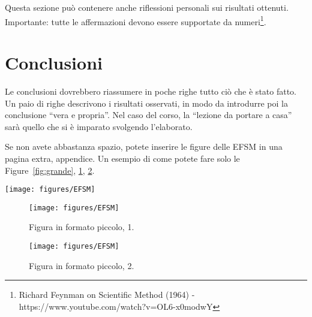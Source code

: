 \documentclass[]{IEEEtran}
\begin{document}
Questa sezione pu\`o contenere anche riflessioni personali sui risultati ottenuti. Importante: tutte le affermazioni devono essere supportate da numeri\footnote{Richard Feynman on Scientific Method (1964) -\\ https://www.youtube.com/watch?v=OL6-x0modwY}.

\section{Conclusioni}
Le conclusioni dovrebbero riassumere in poche righe  tutto ci\`o che \`e stato fatto. Un paio di righe descrivono i risultati osservati, in modo da introdurre poi la conclusione ``vera e propria''. Nel caso del corso, la ``lezione da portare a casa'' sar\`a quello che si \`e imparato svolgendo l'elaborato.





\appendix
Se non avete abbastanza spazio, potete inserire le figure delle EFSM in una  pagina extra, appendice. Un esempio di come potete fare solo le Figure~\ref{fig:grande}, \ref{fig:piccola1}, \ref{fig:piccola2}.


\begin{figure*}[bt]
\centering
\texttt{[image: figures/EFSM]}
\caption{Figura in formato grande.}
\label{fig:grande}
\end{figure*}

\begin{figure}[bt]
	\centering
	\texttt{[image: figures/EFSM]}
	\caption{Figura in formato piccolo, 1.}
	\label{fig:piccola1}
\end{figure}

\begin{figure}[bt]
	\centering
	\texttt{[image: figures/EFSM]}
	\caption{Figura in formato piccolo, 2.}
	\label{fig:piccola2}
\end{figure}
\end{document}
